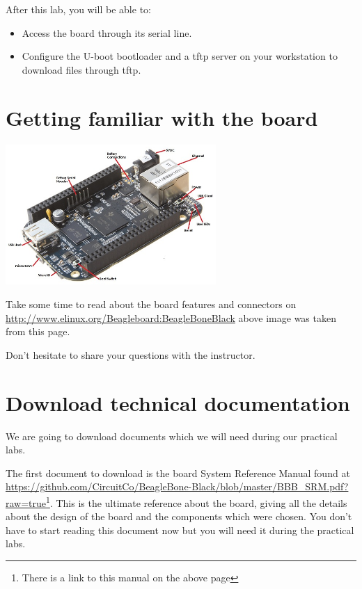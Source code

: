 
After this lab, you will be able to:
\begin{itemize}
\item Access the board through its serial line.
\item Configure the U-boot bootloader and a tftp server
      on your workstation to download files through tftp.
\end{itemize}

\section{Getting familiar with the board}

\begin{center}
\includegraphics[width=8cm]{labs/kernel-board-setup/beaglebone-black-connectors.jpg}
\end{center}

Take some time to read about the board features and connectors on
\url{http://www.elinux.org/Beagleboard:BeagleBoneBlack}
above image was taken from this page.

Don't hesitate to share your questions with the instructor.

\section{Download technical documentation}

We are going to download documents which we will need during our
practical labs.

The first document to download is the board System Reference Manual found at
\url{https://github.com/CircuitCo/BeagleBone-Black/blob/master/BBB_SRM.pdf?raw=true}\footnote{
There is a link to this manual on the above page}.
This is the ultimate reference about the board, giving all the details
about the design of the board and the components which were chosen.
You don't have to start reading this document now but you will need it
during the practical labs.


